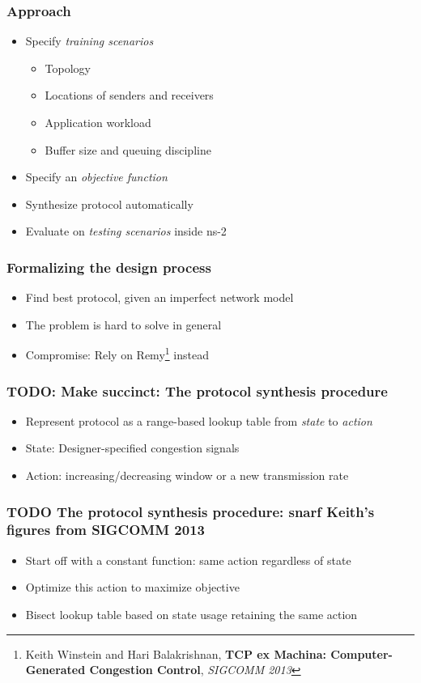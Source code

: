 \documentclass[svgnames]{beamer}
\begin{document}
\begin{Large}
\begin{frame}
\frametitle{Approach}
\begin{itemize}
\item Specify \textit{training scenarios}
\begin{itemize}
\item Topology
\item Locations of senders and receivers
\item Application workload
\item Buffer size and queuing discipline 
\end{itemize}
\item Specify an \textit{objective function}
\item Synthesize protocol automatically
\item Evaluate on \textit{testing scenarios} inside ns-2
\end{itemize}
\end{frame}

\begin{frame}
\frametitle{Formalizing the design process}
\begin{itemize}
\item Find best protocol, given an imperfect network model
\item The problem is hard to solve in general
\item<2-> Compromise: Rely on Remy\footnote<2->{Keith Winstein and Hari Balakrishnan, \textbf{TCP ex Machina: Computer-Generated Congestion Control}, \textit{SIGCOMM 2013}} instead
\end{itemize}
\end{frame}

\begin{frame}
\frametitle{TODO: Make succinct: The protocol synthesis procedure}
\begin{itemize}
\item Represent protocol as a range-based lookup table from \textit{state} to \textit{action}
\item State: Designer-specified congestion signals
\item Action: increasing/decreasing window or a new transmission rate
\end{itemize}
\end{frame}

\begin{frame}
\frametitle{TODO The protocol synthesis procedure: snarf Keith's figures from SIGCOMM 2013}
\begin{itemize}
\item Start off with a constant function: same action regardless of state
\item Optimize this action to maximize objective
\item Bisect lookup table based on state usage retaining the same action
\end{itemize}
\end{frame}


\end{Large}
\end{document}
